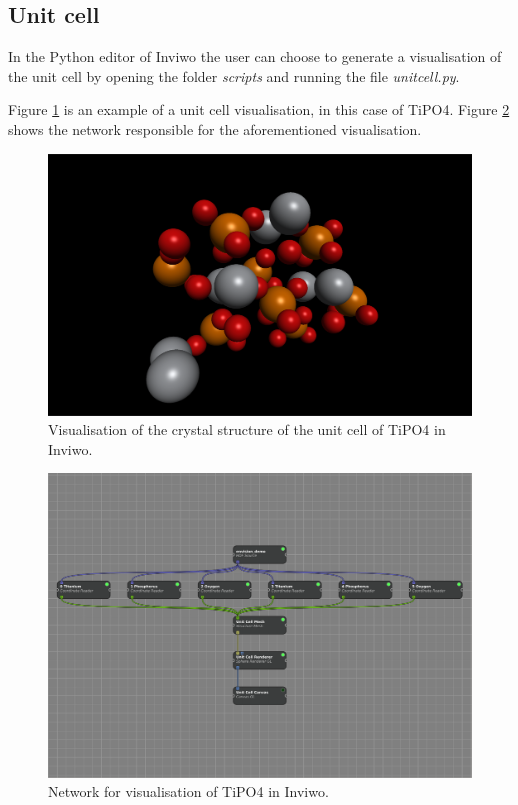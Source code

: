 \documentclass[a4paper,12pt]{article}
\begin{document}
\subsection{Unit cell}
In the Python editor of Inviwo the user can choose to generate a visualisation of the unit cell by opening the folder \textit{scripts} and running the file \textit{unitcell.py}.

Figure \ref{fig:enhetscell} is an example of a unit cell visualisation, in this case of TiPO4. Figure \ref{fig:enhetscellnatverk} shows the network responsible for the aforementioned visualisation.
\begin{figure}[H]
    \centering
    \includegraphics[scale=0.25]{screenshot_enhetscell_TiPO4.png}
    \caption{Visualisation of the crystal structure of the unit cell of TiPO4 in Inviwo.}
    \label{fig:enhetscell}
\end{figure}

\begin{figure}[H]
    \centering
    \includegraphics[scale=0.30]{screenshot_enhetscellnatverk_TiPO4.png}
    \caption{Network for visualisation of TiPO4 in Inviwo.}
    \label{fig:enhetscellnatverk}
\end{figure}
\end{document}
